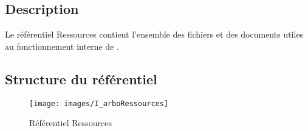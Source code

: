 \subsection{Description}

Le référentiel Ressources contient l'ensemble des fichiers et des documents utiles au fonctionnement
interne de \nomEquipe{}.

\subsection{Structure du référentiel}

\begin{figure}[ht]
         \begin{center}
         \texttt{[image: images/I\_arboRessources]}
         \end{center}
         \caption{Référentiel Ressources}
 \end{figure}


